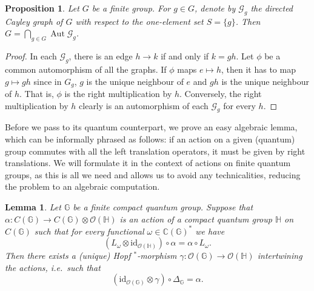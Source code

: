 \documentclass[12pt]{amsart}
\newtheorem{lem}[thm]{Lemma}
\newtheorem{prop}[thm]{Proposition}
\theoremstyle{definition}
\theoremstyle{definition}
\theoremstyle{definition}
\theoremstyle{definition}
\DeclareMathOperator{\Aut}{Aut}
\newcommand{\id}{\mathrm{id}}
\newcommand{\G}{\mathbb{G}}
\newcommand{\Hb}{\mathbb{H}}
\newcommand{\C}{\mathbb{C}}
\newcommand{\Gr}{\mathcal{G}}
\newcommand{\cO}{\mathcal{O}}
\numberwithin{equation}{section}
\begin{document}
\begin{prop}
\label{P.classical1}
    Let $G$ be a finite group. For $g\in G$, denote by $\Gr_g$ the directed Cayley graph of $G$ with respect to the one-element set $S=\{g\}$. Then $G=\bigcap_{g\in G}\Aut\Gr_g$.
\end{prop}
\begin{proof}
    In each $\Gr_g$, there is an edge $h\to k$ if and only if $k=gh$. Let $\phi$ be a common automorphism of all the graphs. If $\phi$ maps $e\mapsto h$, then it has to map $g\mapsto gh$  since in $G_g$, $g$ is the unique neighbour of $e$ and $gh$ is the unique neighbour of $h$. That is, $\phi$ is the right multiplication by $h$. Conversely, the right multiplication by $h$ clearly is an automorphism of each $\Gr_g$ for every $h$.
\end{proof}

Before we pass to its quantum counterpart, we prove an easy algebraic lemma, which can be informally phrased as follows: if an action on a given (quantum) group commutes with all the left translation operators, it must be given by right translations. We will formulate it in the context of actions on finite quantum groups, as this is all we need and allows us to avoid any technicalities, reducing the problem to an algebraic computation.


\begin{lem}\label{lem:commute}
Let $\G$ be a finite compact quantum group. Suppose that $\alpha: C(\G) \to C(\G) \otimes \cO(\Hb)$ is an action of a compact quantum group $\Hb$ on $C(\G)$ such that for every functional $\omega\in \C(\G)^*$  we have
\begin{equation} ( L_\omega  \otimes \id_{\cO(\Hb)}) \circ \alpha = \alpha \circ L_\omega. \label{commuteleft}\end{equation}
Then there exists a (unique) Hopf $^*$-morphism $\gamma: \cO(\G) \to \cO(\Hb)$ intertwining the actions, i.e.\ such that 
\begin{equation} \label{intertwinactions}  (\id_{\cO(\G)} \otimes \gamma) \circ \Delta_\G = \alpha . \end{equation}
\end{lem}
\end{document}
